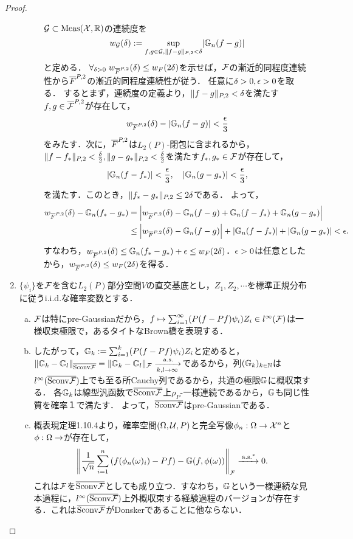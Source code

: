 \documentclass[uplatex,dvipdfmx]{jsreport}
\begin{document}
\begin{proof}
\begin{enumerate}
\begin{description}
            $\mathcal{G}\subset\mathrm{Meas}(\mathcal{X},\mathbb{R})$の連続度を
            \[w_{\mathcal{G}}(\delta):=\sup_{f,g\in\mathcal{G},\|f-g\|_{P,2}<\delta}\lvert\mathbb{G}_n(f-g)\rvert\]
            と定める．
            $\forall_{\delta>0}\;w_{\overline{F}^{P,2}}(\delta)\le w_F(2\delta)$を示せば，$\mathcal{F}$の漸近的同程度連続性から$\overline{F}^{P,2}$の漸近的同程度連続性が従う．
            任意に$\delta>0,\epsilon>0$を取る．
            するとまず，連続度の定義より，$\|f-g\|_{P,2}<\delta$を満たす$f,g\in\overline{\mathcal{F}}^{P,2}$が存在して，
            \[w_{\overline{F}^{P,2}}(\delta)-\lvert\mathbb{G}_n(f-g)\rvert<\frac{\epsilon}{3}\]
            をみたす．次に，$\overline{F}^{P,2}$は$L_2(P)$-閉包に含まれるから，$\|f-f_*\|_{P,2}<\frac{\delta}{2},\|g-g_*\|_{P,2}<\frac{\delta}{2}$を満たす$f_*,g_*\in\mathcal{F}$が存在して，
            \[\lvert\mathbb{G}_n(f-f_*)\rvert<\frac{\epsilon}{3},\quad\lvert\mathbb{G}_n(g-g_*)\rvert<\frac{\epsilon}{3},\]
            を満たす．このとき，$\|f_*-g_*\|_{P,2}\le 2\delta$である．
            よって，
            \begin{align*}
                w_{\overline{F}^{P,2}}(\delta)-\mathbb{G}_n(f_*-g_*)&=\left|w_{\overline{F}^{P,2}}(\delta)-\mathbb{G}_n(f-g)+\mathbb{G}_n(f-f_*)+\mathbb{G}_n(g-g_*)\right|\\
                &\le\left|w_{\overline{F}^{P,2}}(\delta)-\mathbb{G}_n(f-g)\right|+\lvert\mathbb{G}_n(f-f_*)\rvert+\lvert\mathbb{G}_n(g-g_*)\rvert<\epsilon.
            \end{align*}
            すなわち，$w_{\overline{F}^{P,2}}(\delta)\le\mathbb{G}_n(f_*-g_*)+\epsilon\le w_F(2\delta)$．$\epsilon>0$は任意としたから，$w_{\overline{F}^{P,2}}(\delta)\le w_F(2\delta)$を得る．
        \end{description}
        \item $\{\psi_i\}$を$\mathcal{F}$を含む$L_2(P)$部分空間$V$の直交基底とし，$Z_1,Z_2,\cdots$を標準正規分布に従うi.i.d.な確率変数とする．
        \begin{enumerate}[(a)]
            \item $\mathcal{F}$は特にpre-Gaussianだから，$f\mapsto\sum_{i=1}^\infty(P(f-Pf)\psi_i)Z_i\in l^\infty(\mathcal{F})$は一様収束極限で，あるタイトなBrown橋を表現する．
            \item したがって，$\mathbb{G}_k:=\sum_{i=1}^k(P(f-Pf)\psi_i)Z_i$と定めると，$\|\mathbb{G}_k-\mathbb{G}_l\|_{\overline{\mathrm{Sconv}\mathcal{F}}}=\|\mathbb{G}_k-\mathbb{G}_l\|_{\mathcal{F}}\xrightarrow[k,l\to\infty]{\;\mathrm{a.s.}}$であるから，列$(\mathbb{G}_k)_{k\in\mathbb{N}}$は$l^\infty(\overline{\mathrm{Sconv}\mathcal{F}})$上でも至る所Cauchy列であるから，共通の極限$\mathbb{G}$に概収束する．
            各$\mathbb{G}_k$は線型汎函数で$\overline{\mathrm{Sconv}\mathcal{F}}$上$\rho_P$-一様連続であるから，$\mathbb{G}$も同じ性質を確率１で満たす．
            よって，$\overline{\mathrm{Sconv}\mathcal{F}}$はpre-Gaussianである．
            \item 概表現定理1.10.4より，確率空間$(\Omega,\mathcal{U},P)$と完全写像$\phi_n:\Omega\to\mathcal{X}^n$と$\phi:\Omega\to$が存在して，
            \[\left\|\frac{1}{\sqrt{n}}\sum^n_{i=1}\left(f(\phi_n(\omega)_i)-Pf\right)-\mathbb{G}(f,\phi(\omega))\right\|_{\mathcal{F}}\xrightarrow{\;\mathrm{a.s.}^*}0.\]
            これは$\mathcal{F}$を$\overline{\mathrm{Sconv}\mathcal{F}}$としても成り立つ．すなわち，$\mathbb{G}$という一様連続な見本過程に，$l^\infty(\overline{\mathrm{Sconv}\mathcal{F}})$上外概収束する経験過程のバージョンが存在する．これは$\overline{\mathrm{Sconv}\mathcal{F}}$がDonskerであることに他ならない．
        \end{enumerate}
    \end{enumerate}
\end{proof}
\end{document}
